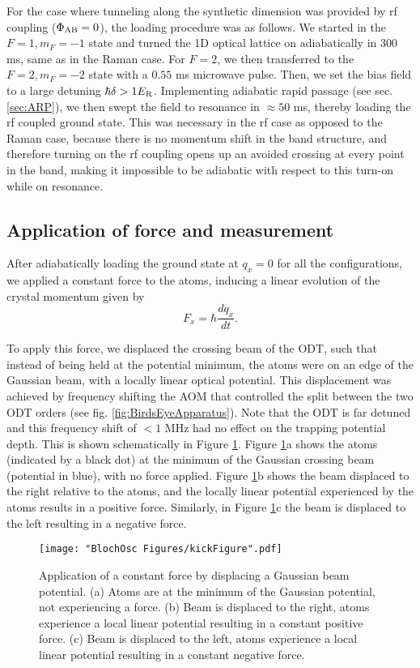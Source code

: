 For the case where tunneling along the synthetic dimension was provided by rf coupling ($\Phi_{\rm AB}=0$), the loading procedure was as follows. We started in the $F=1,m_F=-1$ state and turned the 1D optical lattice on adiabatically in $300$ ms, same as in the Raman case. For $F=2$, we then transferred to the $F=2,m_F=-2$ state with a $0.55$ ms microwave pulse. Then, we set the bias field to a large detuning $\hbar\delta>1 E_{\rm R}$. Implementing adiabatic rapid passage (see sec. \ref{sec:ARP}), we then swept the field to resonance in $\approx 50$ ms, thereby loading the rf coupled ground state. This was necessary in the rf case as opposed to the Raman case, because there is no momentum shift in the band structure, and therefore turning on the rf coupling opens up an avoided crossing at every point in the band, making it impossible to be adiabatic with respect to this turn-on while on resonance. 

\subsection{Application of force and measurement}\label{sec:forceAndMeasure}
After adiabatically loading the ground state at $q_x=0$ for all the configurations, we applied a constant force to the atoms, inducing a linear evolution of the crystal momentum given by
\begin{equation}
F_x=\hbar\frac{dq_x}{dt}.
\end{equation} 	

To apply this force, we displaced the crossing beam of the ODT, such that instead of being held at the potential minimum, the atoms were on an edge of the Gaussian beam, with a locally linear optical potential. This displacement was achieved by frequency shifting the AOM that controlled the split between the two ODT orders (see fig. \ref{fig:BirdsEyeApparatus}). Note that the ODT is far detuned and this frequency shift of $<1$ MHz had no effect on the trapping potential depth. This is shown schematically in Figure \ref{fig:kickFigure}. Figure \ref{fig:kickFigure}a shows the atoms (indicated by a black dot) at the minimum of the Gaussian crossing beam (potential in blue), with no force applied. Figure \ref{fig:kickFigure}b shows the beam displaced to the right relative to the atoms, and the locally linear potential experienced by the atoms results in a positive force. Similarly, in Figure \ref{fig:kickFigure}c the beam is displaced to the left resulting in a negative force. 

\begin{figure}
\texttt{[image: "BlochOsc Figures/kickFigure".pdf]}
\caption[Application of a constant force by displacing a Gaussian beam potential]{Application of a constant force by displacing a Gaussian beam potential. (a) Atoms are at the minimum of the Gaussian potential, not experiencing a force. (b) Beam is displaced to the right, atoms experience a local linear potential resulting in a constant positive force. (c) Beam is displaced to the left, atoms experience a local linear potential resulting in a constant negative force.  }
\label{fig:kickFigure}
\end{figure}

